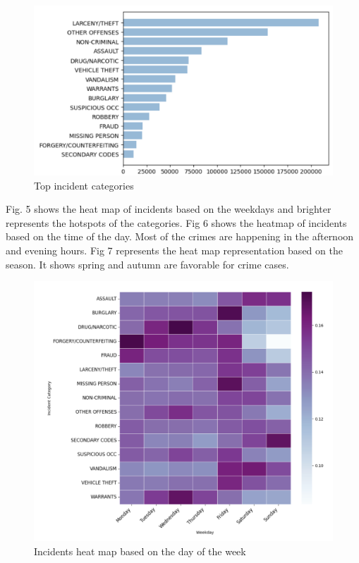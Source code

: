 \documentclass[conference,final, 10pt]{IEEEtran}
\begin{document}
\begin{figure}

{\centering \includegraphics[width=0.95\linewidth]{img/fig4} 

}

\caption{Top incident categories}\label{fig:unnamed-chunk-4}
\end{figure}

Fig. 5 shows the heat map of incidents based on the weekdays and
brighter represents the hotspots of the categories. Fig 6 shows the
heatmap of incidents based on the time of the day. Most of the crimes
are happening in the afternoon and evening hours. Fig 7 represents the
heat map representation based on the season. It shows spring and autumn
are favorable for crime cases.

\begin{figure}

{\centering \includegraphics[width=0.9\linewidth]{img/fig5} 

}

\caption{Incidents heat map based on the day of the week}\label{fig:unnamed-chunk-5}
\end{figure}
\end{document}
